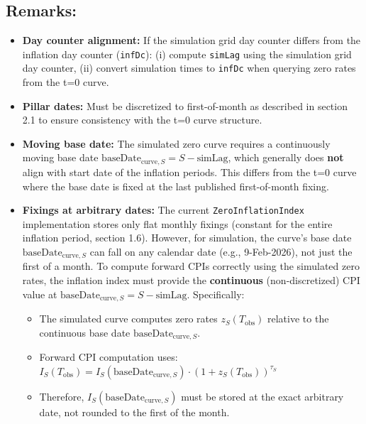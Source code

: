 \documentclass[11pt,a4paper]{article}
\newcommand{\code}[1]{\texttt{#1}}
\begin{document}
\subsection{Remarks:}
\begin{itemize}[leftmargin=*]
\item \textbf{Day counter alignment:} If the simulation grid day counter differs from the inflation day counter (\code{infDc}): (i) compute \code{simLag} using the simulation grid day counter, (ii) convert simulation times to \code{infDc} when querying zero rates from the t=0 curve.

\item \textbf{Pillar dates:} Must be discretized to first-of-month as described in section 2.1 to ensure consistency with the t=0 curve structure.

\item \textbf{Moving base date:} The simulated zero curve requires a continuously moving base date $\text{baseDate}_{\text{curve},S} = S - \text{simLag}$, which generally does \textbf{not} align with start date of the inflation periods. This differs from the t=0 curve where the base date is fixed at the last published first-of-month fixing.

\item \textbf{Fixings at arbitrary dates:} The current \code{ZeroInflationIndex} implementation stores only flat monthly fixings (constant for the entire inflation period, section 1.6). However, for simulation, the curve's base date $\text{baseDate}_{\text{curve},S}$ can fall on any calendar date (e.g., 9-Feb-2026), not just the first of a month. To compute forward CPIs correctly using the simulated zero rates, the inflation index must provide the \textbf{continuous} (non-discretized) CPI value at $\text{baseDate}_{\text{curve},S} = S - \text{simLag}$. Specifically:
  \begin{itemize}
  \item The simulated curve computes zero rates $z_S(T_{\text{obs}})$ relative to the continuous base date $\text{baseDate}_{\text{curve},S}$.
  \item Forward CPI computation uses: $I_S(T_{\text{obs}}) = I_S(\text{baseDate}_{\text{curve},S}) \cdot (1 + z_S(T_{\text{obs}}))^{\tau_S}$
  \item Therefore, $I_S(\text{baseDate}_{\text{curve},S})$ must be stored at the exact arbitrary date, not rounded to the first of the month.
  \end{itemize}

\end{itemize}
\end{document}
